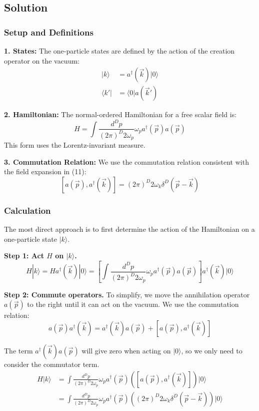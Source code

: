 \documentclass[11pt]{article}
\begin{document}
\begin{itemize}
\subsection{Solution}

\subsubsection{Setup and Definitions}

\textbf{1. States:} The one-particle states are defined by the action of the creation operator on the vacuum:
\begin{align*}
    |k\rangle &= a^\dagger(\vec{k})|0\rangle \\
    \langle k'| &= \langle 0|a(\vec{k}')
\end{align*}

\textbf{2. Hamiltonian:} The normal-ordered Hamiltonian for a free scalar field is:
\[ H = \int \frac{d^Dp}{(2\pi)^D 2\omega_p} \omega_p a^\dagger(\vec{p})a(\vec{p}) \]
This form uses the Lorentz-invariant measure.

\textbf{3. Commutation Relation:} We use the commutation relation consistent with the field expansion in (11):
\[ [a(\vec{p}), a^\dagger(\vec{k})] = (2\pi)^D 2\omega_k \delta^D(\vec{p}-\vec{k}) \]

\subsubsection{Calculation}

The most direct approach is to first determine the action of the Hamiltonian on a one-particle state $|k\rangle$.

\textbf{Step 1: Act $H$ on $|k\rangle$.}
\[ H|k\rangle = H a^\dagger(\vec{k})|0\rangle = \left[ \int \frac{d^Dp}{(2\pi)^D 2\omega_p} \omega_p a^\dagger(\vec{p})a(\vec{p}) \right] a^\dagger(\vec{k})|0\rangle \]

\textbf{Step 2: Commute operators.} To simplify, we move the annihilation operator $a(\vec{p})$ to the right until it can act on the vacuum. We use the commutation relation:
\[ a(\vec{p})a^\dagger(\vec{k}) = a^\dagger(\vec{k})a(\vec{p}) + [a(\vec{p}), a^\dagger(\vec{k})] \]

The term $a^\dagger(\vec{k})a(\vec{p})$ will give zero when acting on $|0\rangle$, so we only need to consider the commutator term.
\begin{align*}
    H|k\rangle &= \int \frac{d^Dp}{(2\pi)^D 2\omega_p} \omega_p a^\dagger(\vec{p}) \left( [a(\vec{p}), a^\dagger(\vec{k})] \right) |0\rangle \\
    &= \int \frac{d^Dp}{(2\pi)^D 2\omega_p} \omega_p a^\dagger(\vec{p}) \left( (2\pi)^D 2\omega_k \delta^D(\vec{p}-\vec{k}) \right) |0\rangle
\end{align*}


\end{itemize}
\end{document}
